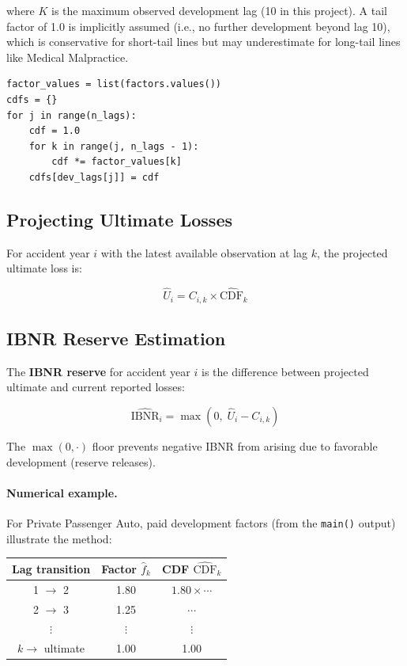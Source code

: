 where $K$ is the maximum observed development lag (10 in this project).
A tail factor of 1.0 is implicitly assumed (i.e., no further development
beyond lag 10), which is conservative for short-tail lines but may
underestimate for long-tail lines like Medical Malpractice.

\begin{lstlisting}[style=python, caption={CDF computation (\texttt{04\_compute\_reserves.py}, lines 91--97)}]
factor_values = list(factors.values())
cdfs = {}
for j in range(n_lags):
    cdf = 1.0
    for k in range(j, n_lags - 1):
        cdf *= factor_values[k]
    cdfs[dev_lags[j]] = cdf
\end{lstlisting}

\subsection{Projecting Ultimate Losses}

For accident year $i$ with the latest available observation at lag $k$,
the projected ultimate loss is:

\begin{equation}
  \hat{U}_i = C_{i,k} \times \widehat{\mathrm{CDF}}_k
  \label{eq:ultimate}
\end{equation}

\subsection{IBNR Reserve Estimation}

The \textbf{IBNR reserve} for accident year $i$ is the difference between
projected ultimate and current reported losses:

\begin{equation}
  \widehat{\mathrm{IBNR}}_i = \max\!\left(0,\; \hat{U}_i - C_{i,k}\right)
  \label{eq:ibnr-cl}
\end{equation}

The $\max(0, \cdot)$ floor prevents negative IBNR from arising due to
favorable development (reserve releases).

\paragraph{Numerical example.}
For Private Passenger Auto, paid development factors
(from the \texttt{main()} output) illustrate the method:

\begin{center}
\begin{tabular}{ccc}
\toprule
\textbf{Lag transition} & \textbf{Factor} $\hat{f}_k$
  & \textbf{CDF} $\widehat{\mathrm{CDF}}_k$ \\
\midrule
1 $\to$ 2 & 1.80 & $1.80 \times \cdots$ \\
2 $\to$ 3 & 1.25 & $\cdots$ \\
$\vdots$   & $\vdots$ & $\vdots$ \\
$k \to$ ultimate & 1.00 & 1.00 \\
\bottomrule
\end{tabular}
\end{center}


